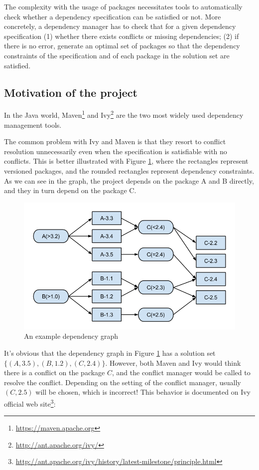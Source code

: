 The complexity with the usage of packages necessitates tools to automatically check whether a dependency specification can be satisfied or not. More concretely, a dependency manager has to check that for a given dependency specification (1) whether there exists conflicts or missing dependencies; (2) if there is no error, generate an optimal set of packages so that the dependency constraints of the specification and of each package in the solution set are satisfied.


\subsection{Motivation of the project}

In the Java world, Maven\footnote{\url{https://maven.apache.org}} and Ivy\footnote{\url{http://ant.apache.org/ivy/}} are the two most widely used dependency management tools.

The common problem with Ivy and Maven is that they resort to conflict resolution unnecessarily even when the specification is satisfiable with no conflicts. This is better illustrated with Figure \ref{fig:introuction:underconstraint}, where the rectangles represent versioned packages, and the rounded rectangles represent dependency constraints.  As we can see in the graph, the project depends on the package A and B directly, and they in turn depend on the package C.

\begin{figure}[ht]
  \center
  \includegraphics[width=14cm]{img/introduction/underconstraint.png}
  \caption[An example dependency graph]{An example dependency graph \label{fig:introuction:underconstraint}}
\end{figure}

It's obvious that the dependency graph in Figure \ref{fig:introuction:underconstraint} has a solution set $\{(A, 3.5), (B, 1.2), (C, 2.4)\}$. However, both Maven and Ivy would think there is a conflict on the package $C$, and the conflict manager would be called to resolve the conflict. Depending on the setting of the conflict manager, usually $(C, 2.5)$ will be chosen, which is incorrect! This behavior is documented on Ivy official web site\footnote{\url{http://ant.apache.org/ivy/history/latest-milestone/principle.html}}:

